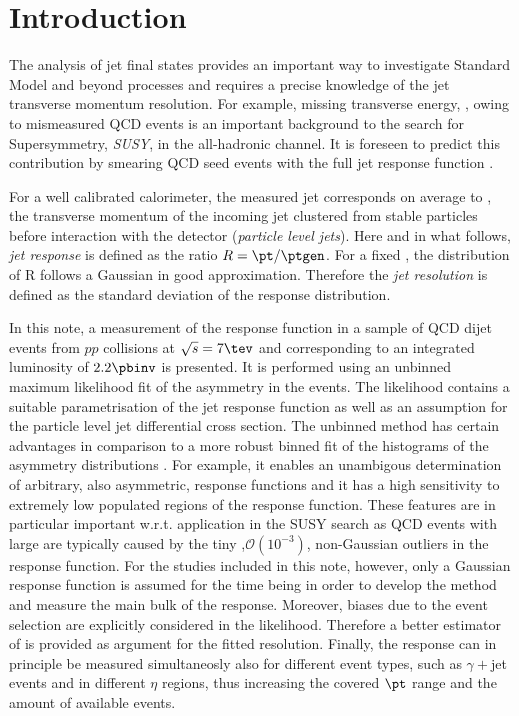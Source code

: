 

\section{Introduction}

The analysis of jet final states provides an important way to investigate Standard Model and beyond processes and requires a precise knowledge of the jet transverse momentum resolution.
For example, missing transverse energy, \met, owing to mismeasured QCD events is an important background to the search for Supersymmetry, \textit{SUSY}, in the all-hadronic channel.
It is foreseen to predict this contribution by smearing QCD seed events with the full jet \pt response function .

For a well calibrated calorimeter, the measured jet \pt corresponds on average to \ptgen, the transverse momentum of the incoming jet clustered from stable particles before interaction with the detector (\textit{particle level jets}).
Here and in what follows, \textit{jet \pt response} is defined as the ratio \mbox{$R = \pt/\ptgen$}.
For a fixed \ptgen, the distribution of R follows a Gaussian in good approximation.
Therefore the \textit{jet \pt resolution} is defined as the standard deviation of the response distribution. 

In this note, a measurement of the response function in a sample of QCD dijet events from $pp$ collisions at \mbox{$\sqrt{s} = 7\tev$} and corresponding to an integrated luminosity of $2.2\pbinv$ is presented.
It is performed using an unbinned maximum likelihood fit of the \pt asymmetry in the events.
The likelihood contains a suitable parametrisation of the jet \pt response function as well as an assumption for the particle level jet differential cross section.
The unbinned method has certain advantages in comparison to a more robust binned fit of the histograms of the asymmetry distributions .
For example, it enables an unambigous determination of arbitrary, also asymmetric, response functions and it has a high sensitivity to extremely low populated regions of the response function.
These features are in particular important w.r.t. application in the SUSY search as QCD events with large \met are typically caused by the tiny ,$\mathcal{O}(10^{-3})$, non-Gaussian outliers in the response function.
For the studies included in this note, however, only a Gaussian response function is assumed for the time being in order to develop the method and measure the main bulk of the response.
Moreover, biases due to the event selection are explicitly considered in the likelihood.
Therefore a better estimator of \ptgen is provided as argument for the fitted resolution.
Finally, the response can in principle be measured simultaneosly also for different event types, such as $\gamma+$jet events and in different $\eta$ regions, thus increasing the covered $\pt$ range and the amount of available events.

